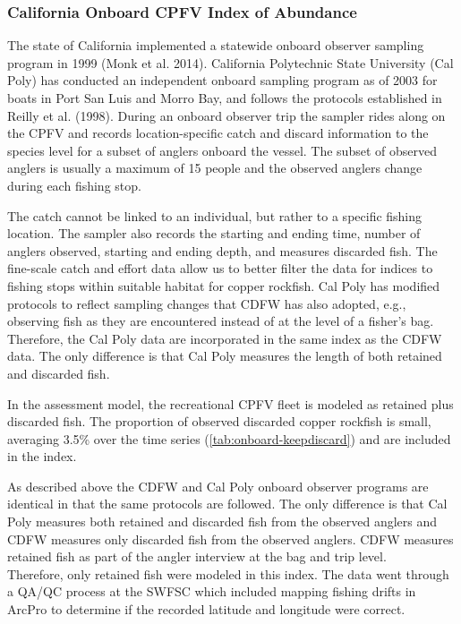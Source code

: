 \documentclass[11pt,
  english,
  letterpaper,
]{article}
\begin{document}
\hypertarget{onboard-cpfv-index}{%
\subsubsection{California Onboard CPFV Index of Abundance}\label{onboard-cpfv-index}}

The state of California implemented a statewide onboard observer sampling program in 1999 (Monk et al. 2014). California Polytechnic State University (Cal Poly) has conducted an independent onboard sampling program as of 2003 for boats in Port San Luis and Morro Bay, and follows the protocols established in Reilly et al. (1998). During an onboard observer trip the sampler rides along on the CPFV and records location-specific catch and discard information to the species level for a subset of anglers onboard the vessel. The subset of observed anglers is usually a maximum of 15 people and the observed anglers change during each fishing stop.

The catch cannot be linked to an individual, but rather to a specific fishing location. The sampler also records the starting and ending time, number of anglers observed, starting and ending depth, and measures discarded fish. The fine-scale catch and effort data allow us to better filter the data for indices to fishing stops within suitable habitat for copper rockfish. Cal Poly has modified protocols to reflect sampling changes that CDFW has also adopted, e.g., observing fish as they are encountered instead of at the level of a fisher's bag. Therefore, the Cal Poly data are incorporated in the same index as the CDFW data. The only difference is that Cal Poly measures the length of both retained and discarded fish.

In the assessment model, the recreational CPFV fleet is modeled as retained plus discarded fish. The proportion of observed discarded copper rockfish is small, averaging 3.5\% over the time series (\ref{tab:onboard-keepdiscard}) and are included in the index.

As described above the CDFW and Cal Poly onboard observer programs are identical in that the same protocols are followed. The only difference is that Cal Poly measures both retained and discarded fish from the observed anglers and CDFW measures only discarded fish from the observed anglers. CDFW measures retained fish as part of the angler interview at the bag and trip level.\\
Therefore, only retained fish were modeled in this index. The data went through a QA/QC process at the SWFSC which included mapping fishing drifts in ArcPro to determine if the recorded latitude and longitude were correct.
\end{document}
